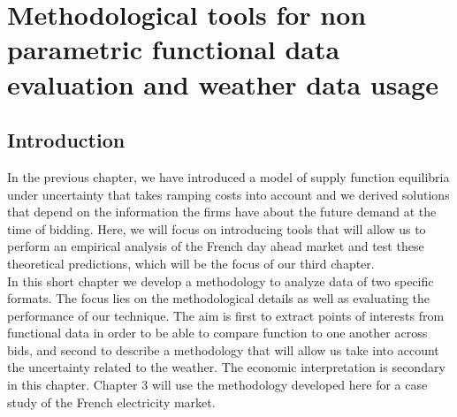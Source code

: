

\renewcommand{\thesection}{\arabic{chapter}.\arabic{section}}


\chapter{Methodological tools for non parametric functional data evaluation and weather data usage} 
\label{chap:ch1-5}
\cleardoublepage

\doublespacing
\section{Introduction}
In the previous chapter, we have introduced a model of supply function equilibria under uncertainty that takes ramping costs into account and we derived solutions that depend on the information the firms have about the future demand at the time of bidding. Here, we will focus on introducing tools that will allow us to perform an empirical analysis of the French day ahead market and test these theoretical predictions, which will be the focus of our third chapter.\\

In this short chapter we develop a methodology to analyze data of two specific formats. The focus lies on the methodological details as well as evaluating the performance of our technique. The aim is first to extract points of interests from functional data in order to be able to compare function to one another across bids, and second to describe a methodology that will allow us take into account the uncertainty related to the weather. The economic interpretation is secondary in this chapter. Chapter 3 will use the methodology developed here for a case study of the French electricity market.\\

